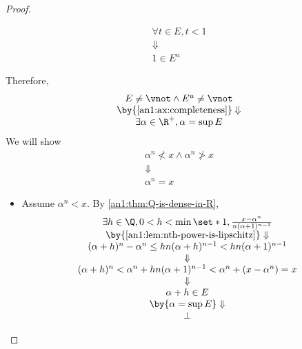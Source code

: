 \begin{proof}
\begin{itemize}
\[\begin{array}{c}
              \forall t \in E, t < 1                               \\
              \Downarrow                                           \\
              1 \in E^{u}
            \end{array}
          \]
  \end{itemize}
  Therefore,
  \[
    \begin{array}{c}
      E \neq \vnot \land E^{u} \neq \vnot        \\
      \by{\Cref{an1:ax:completeness}} \Downarrow \\
      \exists \alpha \in \R^{+}, \alpha = \sup E
    \end{array}
  \]
  We will show
  \[
    \begin{array}{c}
      \alpha^{n} \not< x \land \alpha^{n} \not> x \\
      \Downarrow                                  \\
      \alpha^{n} = x
    \end{array}
  \]
  \begin{itemize}
    \item Assume $\alpha^{n} < x$. By \cref{an1:thm:Q-is-dense-in-R},
          \[
            \begin{array}{c}
              \exists h \in \Q, 0 < h < \min\set*{1, \frac{x - \alpha^{n}}{n(\alpha + 1)^{n - 1}}}       \\
              \by{\Cref{an1:lem:nth-power-is-lipschitz}} \Downarrow                                      \\
              (\alpha + h)^{n} - \alpha^{n} \leq hn(\alpha + h)^{n - 1} < hn(\alpha + 1)^{n - 1}         \\
              \Downarrow                                                                                 \\
              (\alpha + h)^{n} < \alpha^{n} + hn(\alpha + 1)^{n - 1} < \alpha^{n} + (x - \alpha^{n}) = x \\
              \Downarrow                                                                                 \\
              \alpha + h \in E                                                                           \\
              \by{\ensuremath{\alpha = \sup E}} \Downarrow                                               \\
              \bot
            \end{array}
\]
\end{itemize}
\end{proof}
